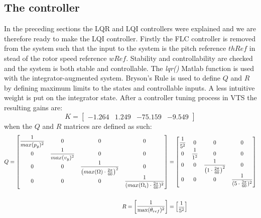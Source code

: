 \subsection{The controller} \label{sec:ctrl_thecontroller}
In the preceding sections the LQR and LQI controllers were explained and we are therefore ready to make the LQI controller. Firstly the FLC controller is removed from the system such that the input to the system is the pitch reference $ thRef $ in stead of the rotor speed reference $ wRef $. Stability and controllability are checked and the system is both stable and controllable. The \textit{lqr()} Matlab function is used with the integrator-augmented system. Bryson's Rule is used to define $ Q $ and $ R $ by defining maximum limits to the states and controllable inputs. A less intuitive weight is put on the integrator state. After a controller tuning process in VTS the resulting gains are:
\begin{equation}\label{eq:lqi_K}
	K = \begin{bmatrix} -1.264 &  1.249 & -75.159 & -9.549 \end{bmatrix}
\end{equation}
when the $ Q $ and $ R $ matrices are defined as such:
\begin{equation}\label{eq:lqi_Q_and_R}
	\begin{split}
		Q = \begin{bmatrix}
			\dfrac{1}{max(p_y)^2}& 0 					& 0 															& 0 \cr
			0 					& \dfrac{1}{max(v_y)^2}	& 0 															& 0 \cr
			0 					& 0 					& \dfrac{1}{\left( max(\Omega) \cdot \frac{2 \pi}{60} \right)^2} & 0 \cr
			0 					& 0 					& 0 															& \dfrac{1}{(max(\Omega_i) \cdot \frac{2 \pi}{60})^2} \end{bmatrix} & = \begin{bmatrix}
			\dfrac{1}{5^2} 	&  	0 				&  0 										&  0 \cr
			0 				&  \dfrac{1}{1^2}	&  0 										&  0 \cr
			0 				&  0 				& \dfrac{1}{\left( 1 \cdot \frac{2 \pi}{60} \right)^2} 	&  0 \cr
			0 				&  0 				&  0 										&  \dfrac{1}{(5 \cdot \frac{2 \pi}{60})^2}
		\end{bmatrix} \\\\
		R = \begin{bmatrix} \dfrac{1}{\max(\theta_{ref})^2} \end{bmatrix} &= \begin{bmatrix} \dfrac{1}{5^2} \end{bmatrix}
	\end{split}
\end{equation}
